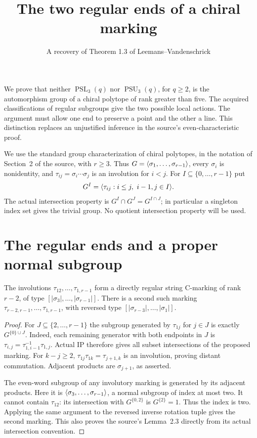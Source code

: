 \documentclass[11pt]{article}
\title{The two regular ends of a chiral marking}
\author{A recovery of Theorem 1.3 of Leemans--Vandenschrick}\date{}
\newcommand{\PSL}{\operatorname{PSL}}\newcommand{\PSU}{\operatorname{PSU}}
\begin{document}
\maketitle
We prove that neither $\PSL_3(q)$ nor $\PSU_3(q)$, for $q\ge2$,
is the automorphism group of a chiral polytope of rank greater than five.
The acquired classifications of regular subgroups give the two possible
local actions. The argument must allow one end to preserve a point
and the other a line. This distinction replaces an unjustified inference
in the source's even-characteristic proof.

We use the standard group characterization of chiral polytopes, in the
notation of Section~2 of the source, with $r\ge3$. Thus $G=\langle\sigma_1,\ldots,
\sigma_{r-1}\rangle$, every $\sigma_i$ is nonidentity, and
$\tau_{ij}=\sigma_i\cdots\sigma_j$ is an involution for $i<j$.
For $I\subseteq\{0,\ldots,r-1\}$ put
\[
 G^I=\langle\tau_{ij}:i\le j,\ i-1,j\in I\rangle.
\]
The actual intersection property is $G^I\cap G^J=G^{I\cap J}$;
in particular a singleton index set gives the trivial group. No
quotient intersection property will be used.

\section*{The regular ends and a proper normal subgroup}
\begin{lemma}\label{ends}
The involutions $\tau_{12},\ldots,\tau_{1,r-1}$ form a directly
regular string C-marking of rank $r-2$, of type
$[|\sigma_3|,\ldots,|\sigma_{r-1}|]$. There is a second such marking
$\tau_{r-2,r-1},\ldots,\tau_{1,r-1}$, with reversed type
$[|\sigma_{r-3}|,\ldots,|\sigma_1|]$.
\end{lemma}
\begin{proof}
For $J\subseteq\{2,\ldots,r-1\}$ the subgroup generated by
$\tau_{1j}$ for $j\in J$ is exactly $G^{\{0\}\cup J}$.
Indeed, each remaining generator with both endpoints in $J$ is
$\tau_{i,j}=\tau_{1,i-1}^{-1}\tau_{1,j}$. Actual IP therefore gives
all subset intersections of the proposed marking. For $k-j\ge2$,
$\tau_{1j}\tau_{1k}=\tau_{j+1,k}$ is an involution, proving distant
commutation. Adjacent products are $\sigma_{j+1}$, as asserted.

The even-word subgroup of any involutory marking is generated by its
adjacent products. Here it is $\langle\sigma_3,\ldots,\sigma_{r-1}\rangle$,
a normal subgroup of index at most two. It cannot contain $\tau_{12}$:
its intersection with $G^{\{0,2\}}$ is $G^{\{2\}}=1$.
Thus the index is two. Applying the same argument to the reversed
inverse rotation tuple gives the second marking. This also proves the
source's Lemma~2.3 directly from its actual intersection convention.
\end{proof}
\end{document}
